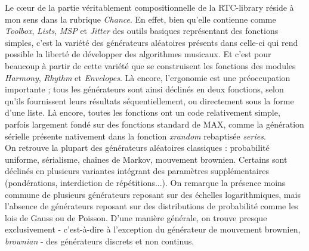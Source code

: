 \documentclass[a4paper,12pt]{article}
\begin{document}
Le cœur de la partie véritablement compositionnelle de la RTC-library réside à mon sens dans la rubrique \emph{Chance}. En effet, bien qu'elle contienne comme \emph{Toolbox}, \emph{Lists}, \emph{MSP} et \emph{Jitter} des outils basiques représentant des fonctions simples, c'est la variété des générateurs aléatoires présents dans celle-ci qui rend possible la liberté de développer des algorithmes musicaux. Et c'est pour beaucoup à partir de cette variété que se construisent les fonctions des modules \emph{Harmony}, \emph{Rhythm} et \emph{Envelopes}. Là encore, l'ergonomie est une préoccupation importante ; tous les générateurs sont ainsi déclinés en deux fonctions, selon qu'ils fournissent leurs résultats séquentiellement, ou directement sous la forme d'une liste. Là encore, toutes les fonctions ont un code relativement simple, parfois largement fondé sur des fonctions standard de MAX, comme la génération sérielle présente nativement dans la fonction \emph{xrandom} rebaptisée \emph{series}. \\
On retrouve la plupart des générateurs aléatoires classiques : probabilité uniforme, sérialisme, chaînes de Markov, mouvement brownien. Certains sont déclinés en plusieurs variantes intégrant des paramètres supplémentaires (pondérations, interdiction de répétitions...). On remarque la présence moins commune de plusieurs générateurs reposant sur des échelles logarithmiques, mais l'absence de générateurs reposant sur des distributions de probabilité comme les lois de Gauss ou de Poisson. D'une manière générale, on trouve presque exclusivement - c'est-à-dire à l'exception du générateur de mouvement brownien, \emph{brownian} - des générateurs discrets et non continus.
\end{document}
